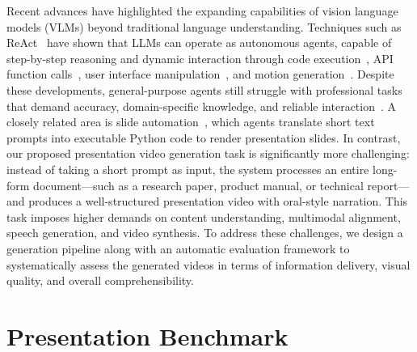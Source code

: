 \documentclass[11pt]{article}
\begin{document}
Recent advances have highlighted the expanding capabilities of vision language models (VLMs) beyond traditional language understanding. Techniques such as ReAct~\cite{react,mmreat,yue2024dots} have shown that LLMs can operate as autonomous agents, capable of step-by-step reasoning and dynamic interaction through code execution~\cite{opendevin,sweagent,yang2024if}, API function calls~\cite{toolformer,octotools,yang2023gpt4tools}, user interface manipulation~\cite{showui,uitars,uivision,wu2024foundations}, and motion generation~\cite{zhang2024motionavatar,zhang2024motion,zhang2024infinimotion,zhang2024kmm,zhang2025motion}. Despite these developments, general-purpose agents still struggle with professional tasks that demand accuracy, domain-specific knowledge, and reliable interaction~\cite{videogui}. A closely related area is slide automation~\cite{autopresent,pptagent}, which agents translate short text prompts into executable Python code to render presentation slides.  In contrast, our proposed presentation video generation task is significantly more challenging: instead of taking a short prompt as input, the system processes an entire long-form document—such as a research paper, product manual, or technical report—and produces a well-structured presentation video with oral-style narration. This task imposes higher demands on content understanding, multimodal alignment, speech generation, and video synthesis. To address these challenges, we design a generation pipeline along with an automatic evaluation framework to systematically assess the generated videos in terms of information delivery, visual quality, and overall comprehensibility.



\section{Presentation Benchmark}
\end{document}
